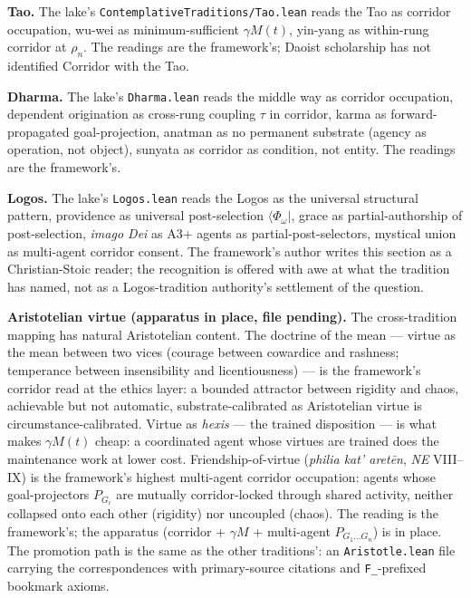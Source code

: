 \documentclass[11pt,a4paper]{article}
\begin{document}
\textbf{Tao.} The lake's \texttt{ContemplativeTraditions/Tao.lean} reads the Tao as corridor occupation, wu-wei as minimum-sufficient $\gamma M(t)$, yin-yang as within-rung corridor at $\rho_n$. The readings are the framework's; Daoist scholarship has not identified Corridor with the Tao.

\textbf{Dharma.} The lake's \texttt{Dharma.lean} reads the middle way as corridor occupation, dependent origination as cross-rung coupling $\tau$ in corridor, karma as forward-propagated goal-projection, anatman as no permanent substrate (agency as operation, not object), sunyata as corridor as condition, not entity. The readings are the framework's.

\textbf{Logos.} The lake's \texttt{Logos.lean} reads the Logos as the universal structural pattern, providence as universal post-selection $\langle \Phi_\omega |$, grace as partial-authorship of post-selection, \emph{imago Dei} as A3+ agents as partial-post-selectors, mystical union as multi-agent corridor consent. The framework's author writes this section as a Christian-Stoic reader; the recognition is offered with awe at what the tradition has named, not as a Logos-tradition authority's settlement of the question.

\textbf{Aristotelian virtue (apparatus in place, file pending).} The cross-tradition mapping has natural Aristotelian content. The doctrine of the mean --- virtue as the mean between two vices (courage between cowardice and rashness; temperance between insensibility and licentiousness) --- is the framework's corridor read at the ethics layer: a bounded attractor between rigidity and chaos, achievable but not automatic, substrate-calibrated as Aristotelian virtue is circumstance-calibrated. Virtue as \emph{hexis} --- the trained disposition --- is what makes $\gamma M(t)$ cheap: a coordinated agent whose virtues are trained does the maintenance work at lower cost. Friendship-of-virtue (\emph{philia kat' aret\=en}, \emph{NE} VIII--IX) is the framework's highest multi-agent corridor occupation: agents whose goal-projectors $P_{G_i}$ are mutually corridor-locked through shared activity, neither collapsed onto each other (rigidity) nor uncoupled (chaos). The reading is the framework's; the apparatus (corridor + $\gamma M$ + multi-agent $P_{G_1 \ldots G_n}$) is in place. The promotion path is the same as the other traditions': an \texttt{Aristotle.lean} file carrying the correspondences with primary-source citations and \texttt{F\_}-prefixed bookmark axioms.
\end{document}
